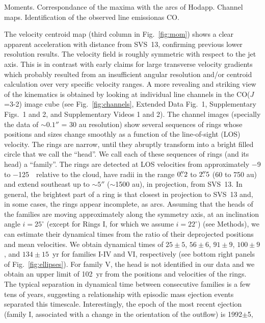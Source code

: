 \documentclass[12pt]{mythesis}
\begin{document}
{\color{blue}
Moments. Correspondance of the maxima with the arcs of Hodapp. Channel maps. Identification of the observed line emissionas CO.
}

  The velocity centroid map (third column in Fig.~\ref{fig:mom}) shows a clear apparent acceleration with distance from SVS~13, confirming previous lower resolution results. The velocity field is roughly symmetric with respect to the jet axis. This is in contrast with early claims for large transverse velocity gradients which probably resulted from an insufficient angular resolution and/or centroid calculation over very specific velocity ranges.
   A more revealing and striking view of the kinematics is obtained by looking at individual line channels in the CO($J$=3-2) image cube (see Fig.~\ref{fig:channels}, Extended Data Fig.\ 1, Supplementary Figs.\ 1 and 2, and Supplementary Videos 1 and 2). The channel images (specially the data of $\sim$$0.1''$ = 30 au resolution) show several sequences of rings whose positions and sizes change smoothly as a function of the line-of-sight (LOS) velocity. The rings are narrow, until they abruptly transform into a bright filled circle that we call the ``head''. We call each of these sequences of rings (and its head) a ``family''. The rings are detected at LOS velocities from approximately $-$9 to $-$125~\kms\ relative to the cloud, have radii in the range $0\mbox{$.\!\!^{\prime\prime}$}2$ to $2\mbox{$.\!\!^{\prime\prime}$}5$ (60 to 750 au) and extend southeast up to $\sim$$5''$ ($\sim$1500 au), in projection, from SVS~13. In general, the brightest part of a ring is that closest in projection to SVS~13 and, in some cases, the rings appear incomplete, as arcs.
  Assuming that the heads of the families are moving approximately along the symmetry axis, at an inclination angle $i=25^\circ$ (except for Rings I, for which we assume $i=22^\circ$) (see Methods), we can estimate their dynamical times from the ratio of their deprojected positions and mean velocities. We obtain dynamical times of $25\pm5$, $56\pm6$, $91\pm9$, $100\pm9$, and $134\pm15$~yr for families I-IV and VI, respectively (see bottom right panels of Fig.~\ref{fig:ellipses}). For family V, the head is not identified in our data and we obtain an upper limit of 102~yr from the positions and velocities of the rings. The typical separation in dynamical time between consecutive families is a few tens of years, suggesting a relationship with episodic mass ejection events separated this timescale. Interestingly, the epoch of the most recent ejection (family I, associated with a change in the orientation of the outflow) is 1992$\pm$5, 
\end{document}

